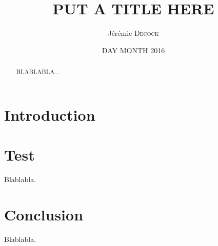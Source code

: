\documentclass{article}
\title{PUT A TITLE HERE}
\author{Jérémie \textsc{Decock}}
\date{DAY MONTH 2016}
\begin{document}
\maketitle

\begin{abstract}
  BLABLABLA...
\end{abstract}

\tableofcontents


\section*{Introduction}\label{sec:intro}



\section{Test}\label{sec:test}

Blablabla.


\section*{Conclusion}\label{sec:ccl}
 
Blablabla.
\end{document}
